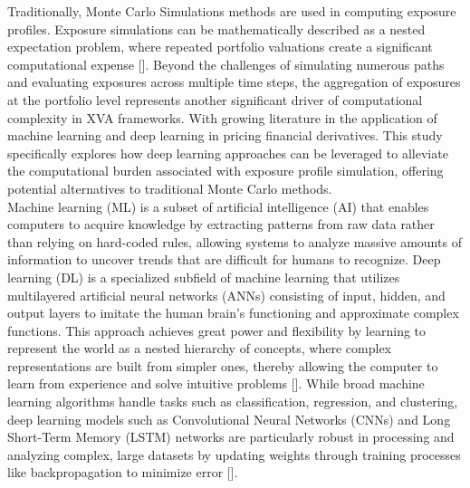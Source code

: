 \noindent
    Traditionally, Monte Carlo Simulations methods are used in computing exposure profiles. Exposure simulations can be mathematically described as a nested expectation problem, where repeated portfolio valuations create a significant computational expense [\cite{deelstra2024accelerated}]. Beyond the challenges of simulating numerous paths and evaluating exposures across multiple time steps, the aggregation of exposures at the portfolio level represents another significant driver of computational complexity in XVA frameworks. With growing literature in the application of machine learning and deep learning in pricing financial derivatives. This study specifically explores how deep learning approaches can be leveraged to alleviate the computational burden associated with exposure profile simulation, offering potential alternatives to traditional Monte Carlo methods. \\

\noindent
    Machine learning (ML) is a subset of artificial intelligence (AI) that enables computers to acquire knowledge by extracting patterns from raw data rather than relying on hard-coded rules, allowing systems to analyze massive amounts of information to uncover trends that are difficult for humans to recognize. Deep learning (DL) is a specialized subfield of machine learning that utilizes multilayered artificial neural networks (ANNs) consisting of input, hidden, and output layers to imitate the human brain's functioning and approximate complex functions. This approach achieves great power and flexibility by learning to represent the world as a nested hierarchy of concepts, where complex representations are built from simpler ones, thereby allowing the computer to learn from experience and solve intuitive problems [\cite{beck2020overview}]. While broad machine learning algorithms handle tasks such as classification, regression, and clustering, deep learning models such as Convolutional Neural Networks (CNNs) and Long Short-Term Memory (LSTM) networks are particularly robust in processing and analyzing complex, large datasets by updating weights through training processes like backpropagation to minimize error [\cite{beck2020overview}]. \\

